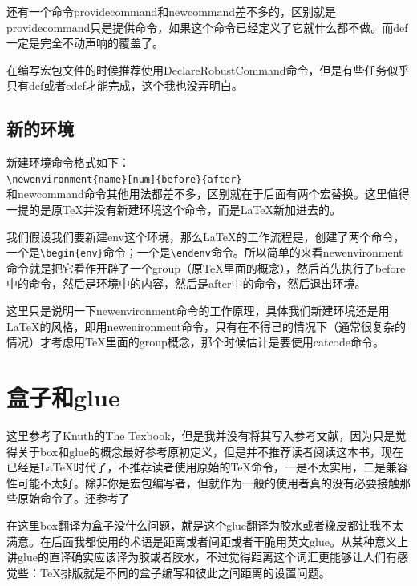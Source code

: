 \documentclass[11pt,oneside]{book}
\begin{document}
还有一个命令providecommand和newcommand差不多的，区别就是providecommand只是提供命令，如果这个命令已经定义了它就什么都不做。而def一定是完全不动声响的覆盖了。

在编写宏包文件的时候推荐使用DeclareRobustCommand命令，但是有些任务似乎只有def或者edef才能完成，这个我也没弄明白。




\section{新的环境}
\label{sec:新的环境}
新建环境命令格式如下：\\
\verb+\newenvironment{name}[num]{before}{after}+\\
和newcommand命令其他用法都差不多，区别就在于后面有两个宏替换。这里值得一提的是原\TeX 并没有新建环境这个命令，而是\LaTeX 新加进去的。

我们假设我们要新建env这个环境，那么\LaTeX 的工作流程是，创建了两个命令，一个是\verb+\begin{env}+命令；一个是\verb+\endenv+命令。所以简单的来看newenvironment命令就是把它看作开辟了一个group（原\TeX 里面的概念），然后首先执行了before中的命令，然后是环境中的内容，然后是after中的命令，然后退出环境。

这里只是说明一下newenvironment命令的工作原理，具体我们新建环境还是用\LaTeX 的风格，即用newenironment命令，只有在不得已的情况下（通常很复杂的情况）才考虑用\TeX 里面的group概念，那个时候估计是要使用catcode命令。



\chapter{盒子和glue}
\label{sec:盒子和glue}
\begin{flushright}
\begin{notecard}[olive!30]{20em}
这里参考了Knuth的The Texbook，但是我并没有将其写入参考文献，因为只是觉得关于box和glue的概念最好参考原初定义，但是并不推荐读者阅读这本书，现在已经是\LaTeX 时代了，不推荐读者使用原始的\TeX 命令，一是不太实用，二是兼容性可能不太好。除非你是宏包编写者，但就作为一般的使用者真的没有必要接触那些原始命令了。还参考了\cite{boxes}
\end{notecard}
\end{flushright}

在这里box翻译为盒子没什么问题，就是这个glue翻译为胶水或者橡皮都让我不太满意。在后面我都使用的术语是距离或者间距或者干脆用英文glue。从某种意义上讲glue的直译确实应该译为胶或者胶水，不过觉得距离这个词汇更能够让人们有感觉些：\TeX 排版就是不同的盒子编写和彼此之间距离的设置问题。
\end{document}
